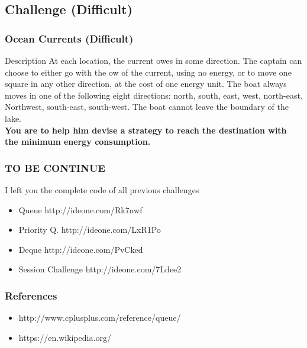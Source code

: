 \documentclass{beamer}
\begin{document}
\subsection{Challenge (Difficult)}
\begin{frame}
\frametitle{Ocean Currents (Difficult)}

\begin{block}{Description}
At each location, the current  owes in some direction. The captain can choose to either go with the
 ow of the current, using no energy, or to move one square in any other direction, at the cost of one
energy unit. The boat always moves in one of the following eight directions: north, south, east, west,
north-east, Northwest, south-east, south-west. The boat cannot leave the boundary of the lake.\\

\textbf{You are to help him devise a strategy to reach the destination with the minimum energy consumption.}
\end{block}

\end{frame}
\begin{frame}[fragile]
\frametitle{ TO BE CONTINUE }
I left you the complete code of all previous challenges
\begin{itemize}
	\item Queue http://ideone.com/Rk7nwf
	\item Priority Q. http://ideone.com/LxR1Po
	\item Deque http://ideone.com/PvCked
	\item Session Challenge http://ideone.com/7Ldee2
\end{itemize}
\end{frame}
\begin{frame}
\frametitle{ References }
\begin{itemize}
	\item http://www.cplusplus.com/reference/queue/
	\item https://en.wikipedia.org/
\end{itemize}
\end{frame}
\end{document}
